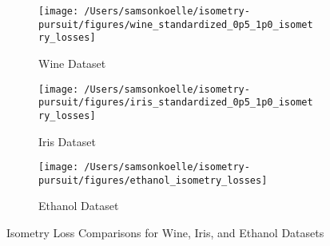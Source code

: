 \begin{figure}[t]
    \centering
    \begin{subfigure}[b]{0.3\textwidth}
        \centering
        \texttt{[image: /Users/samsonkoelle/isometry-pursuit/figures/wine\_standardized\_0p5\_1p0\_isometry\_losses]}
        \caption{Wine Dataset}
        \label{fig:wine_isometry_losses}
    \end{subfigure}
    \hfill
    \begin{subfigure}[b]{0.3\textwidth}
        \centering
        \texttt{[image: /Users/samsonkoelle/isometry-pursuit/figures/iris\_standardized\_0p5\_1p0\_isometry\_losses]}
        \caption{Iris Dataset}
        \label{fig:iris_isometry_losses}
    \end{subfigure}
    \hfill
    \begin{subfigure}[b]{0.3\textwidth}
        \centering
        \texttt{[image: /Users/samsonkoelle/isometry-pursuit/figures/ethanol\_isometry\_losses]}
        \caption{Ethanol Dataset}
        \label{fig:ethanol_isometry_losses}
    \end{subfigure}
    \caption{Isometry Loss Comparisons for Wine, Iris, and Ethanol Datasets}
    \label{fig:isometry_losses}
\end{figure}



